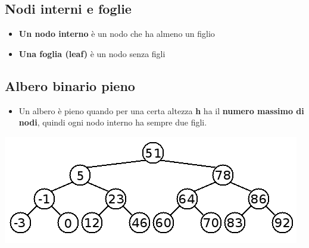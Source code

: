 \subsection{Nodi interni e foglie}
\begin{itemize}
    \item \textbf{Un nodo interno} è un nodo che ha almeno un figlio
    \item \textbf{Una foglia (leaf)} è un nodo senza figli
\end{itemize}
\subsection{Albero binario pieno}
\begin{itemize}
    \item Un albero è pieno quando per una certa altezza \textbf{h} ha il \textbf{numero massimo di nodi}, quindi ogni nodo interno ha sempre due figli.
\end{itemize}
\begin{center}
    \includegraphics[scale = 0.6]{Capitoli/Alberi Binari/Esempi/AlberoPieno.png}
\end{center}
\newpage
